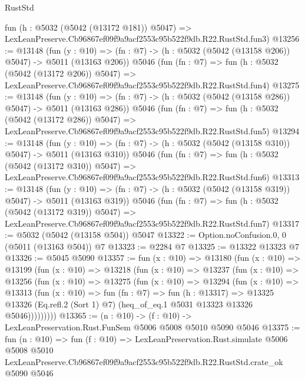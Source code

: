 \begin{lexlean}{RustStd}
\begin{coremodule}
    fun (h : @5032 (@5042 (@13172 @181)) @5047) =>
    LexLeanPreserve.Cb96867ef09f9a9acf2553c95b522f9db.R22.RustStd.fun3)
@13256 := @13148
    (fun (y : @10) => (fn : @7) -> (h : @5032 (@5042 (@13158 @206)) @5047) -> @5011 (@13163 @206))
    @5046
    (fun (fn : @7) =>
    fun (h : @5032 (@5042 (@13172 @206)) @5047) =>
    LexLeanPreserve.Cb96867ef09f9a9acf2553c95b522f9db.R22.RustStd.fun4)
@13275 := @13148
    (fun (y : @10) => (fn : @7) -> (h : @5032 (@5042 (@13158 @286)) @5047) -> @5011 (@13163 @286))
    @5046
    (fun (fn : @7) =>
    fun (h : @5032 (@5042 (@13172 @286)) @5047) =>
    LexLeanPreserve.Cb96867ef09f9a9acf2553c95b522f9db.R22.RustStd.fun5)
@13294 := @13148
    (fun (y : @10) => (fn : @7) -> (h : @5032 (@5042 (@13158 @310)) @5047) -> @5011 (@13163 @310))
    @5046
    (fun (fn : @7) =>
    fun (h : @5032 (@5042 (@13172 @310)) @5047) =>
    LexLeanPreserve.Cb96867ef09f9a9acf2553c95b522f9db.R22.RustStd.fun6)
@13313 := @13148
    (fun (y : @10) => (fn : @7) -> (h : @5032 (@5042 (@13158 @319)) @5047) -> @5011 (@13163 @319))
    @5046
    (fun (fn : @7) =>
    fun (h : @5032 (@5042 (@13172 @319)) @5047) =>
    LexLeanPreserve.Cb96867ef09f9a9acf2553c95b522f9db.R22.RustStd.fun7)
@13317 := @5032 (@5042 (@13158 @504)) @5047
@13322 := Option.noConfusion.{0, 0} (@5011 (@13163 @504)) @7
@13323 := @2284 @7
@13325 := @13322 @13323 @7
@13326 := @5045 @5090
@13357 := fun (x : @10) =>
  @13180
    (fun (x : @10) =>
    @13199
      (fun (x : @10) =>
      @13218
        (fun (x : @10) =>
        @13237
          (fun (x : @10) =>
          @13256
            (fun (x : @10) =>
            @13275
              (fun (x : @10) =>
              @13294
                (fun (x : @10) =>
                @13313
                  (fun (x : @10) =>
                  fun (fn : @7) =>
                  fun (h : @13317) =>
                  @13325
                    @13326
                    (Eq.refl.{2} (Sort 1) @7)
                    (heq_of_eq.{1} @5031 @13323 @13326 @5046)))))))))
@13365 := (n : @10) -> (f : @10) -> LexLeanPreservation.Rust.FunSem @5006 @5008 @5010 @5090 @5046
@13375 := fun (n : @10) =>
  fun (f : @10) =>
  LexLeanPreservation.Rust.simulate
    @5006
    @5008
    @5010
    LexLeanPreserve.Cb96867ef09f9a9acf2553c95b522f9db.R22.RustStd.crate_ok
    @5090
    @5046
\end{coremodule}
\end{lexlean}
